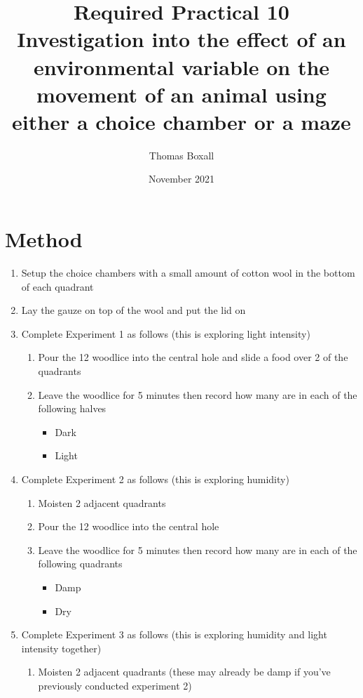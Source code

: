 \documentclass{thomasClass}
\title{\textbf{Required Practical 10}
\\Investigation into the effect of an environmental variable on the movement of an animal using either a choice chamber or a maze
}
\author{Thomas Boxall}
\date{November 2021}
\begin{document}
\maketitle

\section{Method}
\begin{enumerate}
    \item Setup the choice chambers with a small amount of cotton wool in the bottom of each quadrant
    \item Lay the gauze on top of the wool and put the lid on
    \item Complete Experiment 1 as follows (this is exploring light intensity)
    \begin{enumerate}
        \item Pour the 12 woodlice into the central hole and slide a food over 2 of the quadrants
        \item Leave the woodlice for 5 minutes then record how many are in each of the following halves
        \begin{itemize}
            \item Dark
            \item Light
        \end{itemize}
    \end{enumerate}
    \item Complete Experiment 2 as follows (this is exploring humidity)
    \begin{enumerate}
        \item Moisten 2 adjacent quadrants
        \item Pour the 12 woodlice into the central hole
        \item Leave the woodlice for 5 minutes then record how many are in each of the following quadrants
        \begin{itemize}
            \item Damp
            \item Dry
        \end{itemize}
    \end{enumerate}
    \item Complete Experiment 3 as follows (this is exploring humidity and light intensity together)
    \begin{enumerate}
        \item Moisten 2 adjacent quadrants (these may already be damp if you've previously conducted experiment 2)

\end{enumerate}
\end{enumerate}
\end{document}
